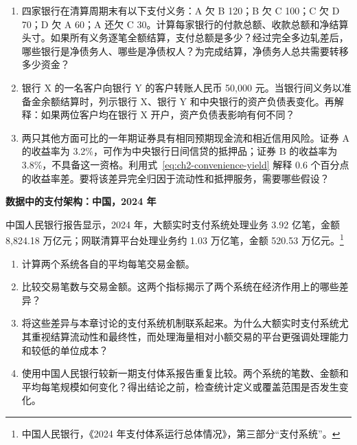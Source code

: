 \begin{enumerate}

\item 四家银行在清算周期末有以下支付义务：A 欠 B 120；B 欠 C 100；C 欠 D 70；D 欠 A 60；A 还欠 C 30。计算每家银行的付款总额、收款总额和净结算头寸。如果所有义务逐笔全额结算，支付总额是多少？经过完全多边轧差后，哪些银行是净债务人、哪些是净债权人？为完成结算，净债务人总共需要转移多少资金？

\item 银行 X 的一名客户向银行 Y 的客户转账人民币 50,000 元。当银行间义务以准备金余额结算时，列示银行 X、银行 Y 和中央银行的资产负债表变化。再解释：如果两位客户均在银行 X 开户，资产负债表影响有何不同？

\item 两只其他方面可比的一年期证券具有相同预期现金流和相近信用风险。证券 A 的收益率为 3.2\%，可作为中央银行日间信贷的抵押品；证券 B 的收益率为 3.8\%，不具备这一资格。利用式~\eqref{eq:ch2-convenience-yield} 解释 0.6 个百分点的收益率差。要将该差异完全归因于流动性和抵押服务，需要哪些假设？

\end{enumerate}



\textbf{数据中的支付架构：中国，2024 年}

中国人民银行报告显示，2024 年，大额实时支付系统处理业务 3.92 亿笔，金额 8,824.18 万亿元；网联清算平台处理业务约 1.03 万亿笔，金额 520.53 万亿元。\footnote{中国人民银行，《2024 年支付体系运行总体情况》，第三部分“支付系统”。}

\begin{enumerate}

\item 计算两个系统各自的平均每笔交易金额。

\item 比较交易笔数与交易金额。这两个指标揭示了两个系统在经济作用上的哪些差异？


\item 将这些差异与本章讨论的支付系统机制联系起来。为什么大额实时支付系统尤其重视结算流动性和最终性，而处理海量相对小额交易的平台更强调处理能力和较低的单位成本？





\item 使用中国人民银行较新一期支付体系报告重复比较。两个系统的笔数、金额和平均每笔规模如何变化？得出结论之前，检查统计定义或覆盖范围是否发生变化。




\end{enumerate}

